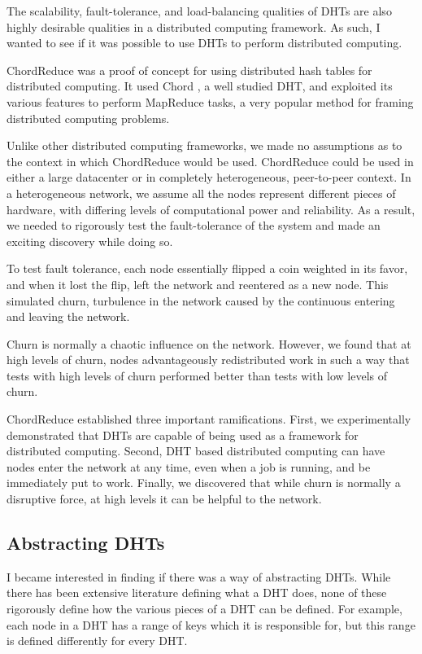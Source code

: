 \documentclass[letterpaper]{article}
\begin{document}
The scalability, fault-tolerance, and load-balancing qualities of DHTs are also highly desirable qualities in a distributed computing framework.
As such, I wanted to see if it was possible to use DHTs to perform distributed computing.

ChordReduce \cite{chordreduce} was a proof of concept for using distributed hash tables for distributed computing.  
It used Chord \cite{chord}, a well studied DHT, and exploited its various features to perform MapReduce \cite{mapreduce} tasks, a very popular method for framing distributed computing problems.

Unlike other distributed computing frameworks, we made no assumptions as to the context in which ChordReduce would be used.
ChordReduce could be used in either a large datacenter or in completely heterogeneous, peer-to-peer context.
In a heterogeneous network, we assume all the nodes represent different pieces of hardware, with differing levels of computational power and reliability.
As a result, we needed to rigorously test the fault-tolerance of the system and made an exciting discovery while doing so.

To test fault tolerance, each node essentially flipped a coin weighted in its favor, and when it lost the flip, left the network and reentered as a new node.
This simulated churn, turbulence in the network caused by the continuous entering and leaving the network.

Churn is normally a chaotic influence on the network. 
However, we found that at high levels of churn, nodes advantageously redistributed work in such a way that tests with high levels of churn performed better than tests with low levels of churn.

ChordReduce established three important ramifications.
First, we experimentally demonstrated that DHTs are capable of being used as a framework for distributed computing.
Second, DHT based distributed computing can have nodes enter the network at any time, even when a job is running, and be immediately put to work.
Finally, we discovered that while churn is normally a disruptive force, at high levels it can be helpful to the network.


\subsection{Abstracting DHTs}
I became interested in finding if there was a way of abstracting DHTs.
While there has been extensive literature defining what a DHT does, none of these rigorously define how the various pieces of a DHT can be defined.
For example, each node in a DHT has a range of keys which it is responsible for, but this range is defined differently for every DHT. 
\end{document}
